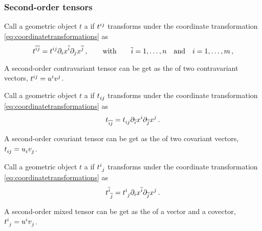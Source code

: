 \subsubsection{Second-order tensors}

\begin{definition}
  Call a geometric object $t$ a  if $\itens t{^i^j}$ transforms under the coordinate transformation \cref{eq:coordinatetransformations} as
  \begin{equation*}
    \itens t{^{\bidx i}^{\bidx j}} = \itens t{^i^j}\ipd i\tvec\pos{\bidx i}\ipd j\tvec\pos{\bidx j}\,,\qquad\text{with}\qquad
    \bidx i = 1, \dotsc, n
    \quad\text{and}\quad
    i = 1, \dotsc, m\,,
  \end{equation*}
\end{definition}

A second-order contravariant tensor can be get as the  of two contravariant vectors, $\itens t{^i^j} = \tvec ui\tvec vj$.

\begin{definition}
  Call a geometric object $t$ a  if $\itens t{_i_j}$ transforms under the coordinate transformation \cref{eq:coordinatetransformations} as
  \begin{equation*}
    \itens t{_{\bidx i}_{\bidx j}} = \itens t{_i_j}\aipd i\tvec\pos i\aipd j\tvec\pos j\,.
  \end{equation*}
\end{definition}

A second-order covariant tensor can be get as the  of two covariant vectors, $\itens t{_i_j} = \tcov ui\tcov vj$.

\begin{definition}
  Call a geometric object $t$ a  if $\itens t{^i_j}$ transforms under the coordinate transformation \cref{eq:coordinatetransformations} as
  \begin{equation*}
    \itens t{^{\bidx i}_{\bidx j}} = \itens t{^i_j}\ipd i\atvec\pos i\aipd j\tvec\pos j\,.
  \end{equation*}
\end{definition}

A second-order mixed tensor can be get as the  of a vector and a covector, $\itens t{^i_j} = \tvec ui\tcov vj$.

